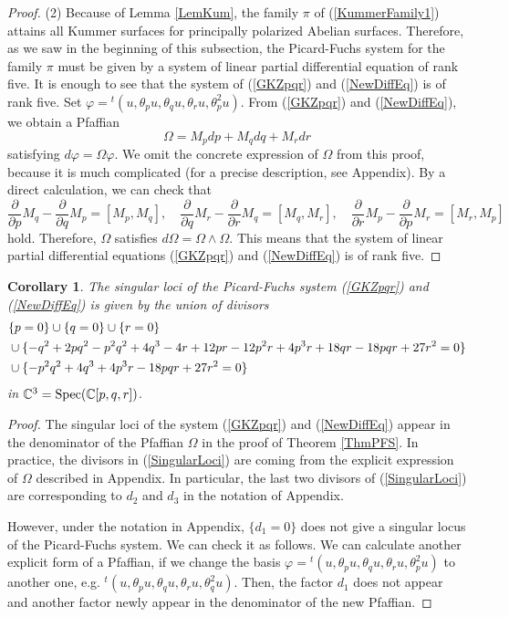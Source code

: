 \documentclass[10pt]{article}
\newtheorem{cor}{Corollary}[section]
\begin{document}
\begin{proof}
(2) Because of Lemma \ref{LemKum},  the family $\pi$ of  (\ref{KummerFamily1}) attains all Kummer surfaces for principally polarized Abelian surfaces.
Therefore, as we saw in the beginning of this subsection,
the Picard-Fuchs system for the family $\pi$ must be given by a system of linear partial differential equation of rank five.
It is enough to see that the system of (\ref{GKZpqr}) and (\ref{NewDiffEq}) is of rank five.
Set $\varphi={}^t (u,\theta_p u, \theta_q u, \theta_r u, \theta_{p}^2 u) $.
From (\ref{GKZpqr}) and (\ref{NewDiffEq}), we obtain a Pfaffian 
$$
\Omega= M_p dp + M_q dq + M_r dr
$$
satisfying $d\varphi =\Omega \varphi$.
We omit the concrete expression of $\Omega$ from this proof, because it is much complicated (for a precise description, see Appendix).
By a direct calculation, we can check that
$$
\frac{\partial}{\partial p} M_q - \frac{\partial}{\partial q} M_p =[M_p, M_q] ,\quad
\frac{\partial}{\partial q} M_r - \frac{\partial}{\partial r} M_q =[M_q, M_r] , \quad
\frac{\partial}{\partial r} M_p - \frac{\partial}{\partial p} M_r =[M_r, M_p] 
$$
hold.
Therefore, $\Omega$ satisfies $d\Omega = \Omega \wedge \Omega$.
This means that the system of linear partial differential equations (\ref{GKZpqr}) and (\ref{NewDiffEq}) is of rank five.
\end{proof}


\begin{cor}\label{CorSingular}
The singular loci of 
the  Picard-Fuchs system (\ref{GKZpqr}) and (\ref{NewDiffEq}) 
is given by the union of divisors
\begin{align}\label{SingularLoci}
&\{p=0\} \cup \{q=0\}\cup \{r=0\} \notag \\
&\cup \{-q^2 + 2 p q^2 - p^2 q^2 + 4 q^3 - 4 r + 12 p r - 12 p^2 r +  4 p^3 r + 18 q r - 18 p q r + 27 r^2 =0 \} \notag \\
&\cup \{ -p^2 q^2 + 4 q^3 + 4 p^3 r - 18 p q r + 27 r^2 =0\}
\end{align}
in $\mathbb{C}^3 ={\rm Spec}(\mathbb{C}[p,q,r])$.
\end{cor}

\begin{proof}
The singular loci of the system   (\ref{GKZpqr}) and (\ref{NewDiffEq})  appear in the denominator of the Pfaffian $\Omega$ in the proof of Theorem \ref{ThmPFS}.
In practice, the divisors in (\ref{SingularLoci}) are coming from the explicit expression of $\Omega$ described in Appendix.
In particular, the last two divisors of (\ref{SingularLoci}) are corresponding to $d_2 $ and $d_3$ in  the notation of Appendix.

However, under the notation in Appendix, $\{d_1=0\}$ does not give a singular locus of the Picard-Fuchs system.
We can check it as follows.
We can calculate another explicit form of a Pfaffian,  if we change the basis $\varphi={}^t (u,\theta_p u, \theta_q u, \theta_r u, \theta_{p}^2 u) $ to another one, e.g. ${}^t (u,\theta_p u, \theta_q u, \theta_r u, \theta_{q}^2 u) $.
Then, the factor $d_1$ does not appear and another factor newly appear in the denominator of the new Pfaffian.  
\end{proof}
\end{document}
